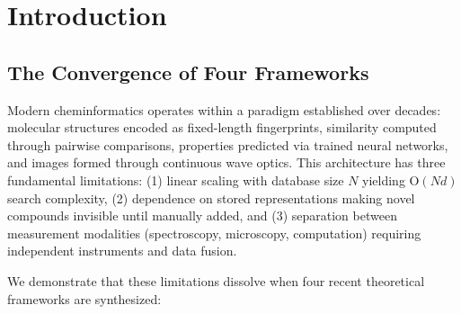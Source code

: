 \documentclass[11pt,a4paper]{article}
\theoremstyle{definition}
\theoremstyle{remark}
\begin{document}
\tableofcontents
\newpage

\section{Introduction}

\subsection{The Convergence of Four Frameworks}

Modern cheminformatics operates within a paradigm established over decades: molecular structures encoded as fixed-length fingerprints, similarity computed through pairwise comparisons, properties predicted via trained neural networks, and images formed through continuous wave optics. This architecture has three fundamental limitations: (1) linear scaling with database size $N$ yielding O$(Nd)$ search complexity, (2) dependence on stored representations making novel compounds invisible until manually added, and (3) separation between measurement modalities (spectroscopy, microscopy, computation) requiring independent instruments and data fusion.

We demonstrate that these limitations dissolve when four recent theoretical frameworks are synthesized:
\end{document}

